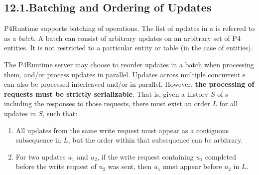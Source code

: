 \documentclass[11pt]{article}
\begin{document}
{%
\subsection{12.1.\hspace*{0.5em}Batching and Ordering of Updates}\label{sec-batching-and-ordering-of-updates}%

\noindent{}P4Runtime supports batching of  operations. The list of updates in a
 is referred to as a \emph{batch}. A batch can consist of arbitrary
updates on an arbitrary set of P4 entities. It is not restricted to a particular
entity or table (in the case of  entities).%

The P4Runtime server may choose to reorder updates in a batch when processing
them, and/or process updates in parallel.  Updates across multiple concurrent
s can also be processed interleaved and/or in parallel.
However, \textbf{the processing of requests must be strictly serializable}.  That
is, given a history $S$ of s including the responses to those
requests, there must exist an order $L$ for all updates in $S$, such that:%

\begin{enumerate}[noitemsep,topsep=\mdcompacttopsep]%

\item{}All updates from the same write request must appear as a contiguous
subsequence in $L$, but the order within that subsequence can be arbitrary.%

\item{}For two updates $u_1$ and $u_2$, if the write request containing $u_1$
completed before the write request of $u_2$ was sent, then $u_1$ must appear
before $u_2$ in $L$.%


\end{enumerate}}
\end{document}
